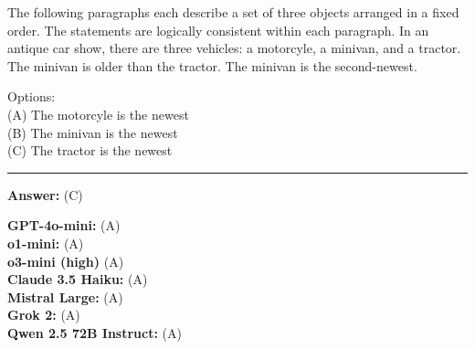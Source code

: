 \begin{tcolorbox}[colback=gray!3, colframe=gray!50, arc=2mm, boxrule=0.5pt, title={\textit{Logical Deductions 3 Object}}, coltitle=black, colbacktitle=gray!20]  
    
    The following paragraphs each describe a set of three objects arranged in a fixed order. The statements are logically consistent within each paragraph. In an antique car show, there are three vehicles: a motorcyle, a minivan, and a tractor. The minivan is older than the tractor. The minivan is the second-newest.

    \medskip
    
    Options: \\
    (A) The motorcyle is the newest \\
    (B) The minivan is the newest \\
    (C) The tractor is the newest

    \noindent
    \begin{center}
        \rule{0.9\textwidth}{0.4pt}
    \end{center}
    
    \textbf{Answer:} (C)

    \medskip


    \textbf{GPT-4o-mini:} (A) \\
    \textbf{o1-mini:} (A) \\
    \textbf{o3-mini (high)} (A) \\
    \textbf{Claude 3.5 Haiku:} (A) \\
    \textbf{Mistral Large:} (A) \\
    \textbf{Grok 2:} (A) \\
    \textbf{Qwen 2.5 72B Instruct:} (A)

\end{tcolorbox}
\vspace{\baselineskip}



